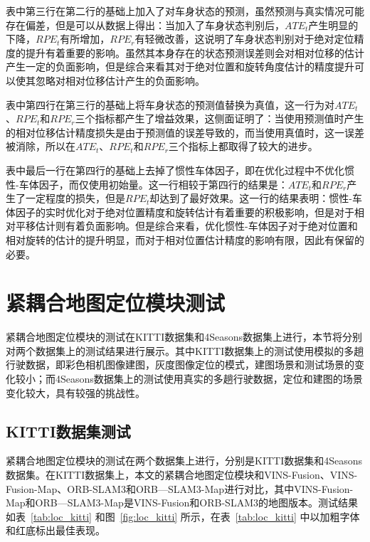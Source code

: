 表中第三行在第二行的基础上加入了对车身状态的预测，虽然预测与真实情况可能存在偏差，但是可以从数据上得出：当加入了车身状态判别后，$ATE_t$产生明显的下降，$RPE_t$有所增加，$RPE_r$有轻微改善，这说明了车身状态判别对于绝对定位精度的提升有着重要的影响。虽然其本身存在的状态预测误差则会对相对位移的估计产生一定的负面影响，但是综合来看其对于绝对位置和旋转角度估计的精度提升可以使其忽略对相对位移估计产生的负面影响。

表中第四行在第三行的基础上将车身状态的预测值替换为真值，这一行为对$ATE_t$、$RPE_t$和$RPE_r$三个指标都产生了增益效果，这侧面证明了：当使用预测值时产生的相对位移估计精度损失是由于预测值的误差导致的，而当使用真值时，这一误差被消除，所以在$ATE_t$、$RPE_t$和$RPE_r$三个指标上都取得了较大的进步。

表中最后一行在第四行的基础上去掉了惯性车体因子，即在优化过程中不优化惯性-车体因子，而仅使用初始量。这一行相较于第四行的结果是：$ATE_t$和$RPE_r$产生了一定程度的损失，但是$RPE_t$却达到了最好效果。这一行的结果表明：惯性-车体因子的实时优化对于绝对位置精度和旋转估计有着重要的积极影响，但是对于相对平移估计则有着负面影响。但是综合来看，优化惯性-车体因子对于绝对位置和相对旋转的估计的提升明显，而对于相对位置估计精度的影响有限，因此有保留的必要。

\section{紧耦合地图定位模块测试}
紧耦合地图定位模块的测试在KITTI数据集和4Seasons数据集上进行，本节将分别对两个数据集上的测试结果进行展示。其中KITTI数据集上的测试使用模拟的多趟行驶数据，即彩色相机图像建图，灰度图像定位的模式，建图场景和测试场景的变化较小；而4Seasons数据集上的测试使用真实的多趟行驶数据，定位和建图的场景变化较大，具有较强的挑战性。

\subsection{KITTI数据集测试}
紧耦合地图定位模块的测试在两个数据集上进行，分别是KITTI数据集和4Seasons数据集。在KITTI数据集上，本文的紧耦合地图定位模块和VINS-Fusion、VINS-Fusion-Map、ORB-SLAM3和ORB—SLAM3-Map进行对比，其中VINS-Fusion-Map和ORB—SLAM3-Map是VINS-Fusion和ORB-SLAM3的地图版本。测试结果如表~\ref{tab:loc_kitti} 和图~\ref{fig:loc_kitti} 所示，在表~\ref{tab:loc_kitti} 中以加粗字体和红底标出最佳表现。

